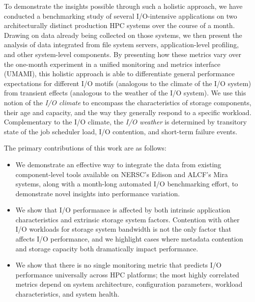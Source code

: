 To demonstrate the insights possible through such a holistic approach, we have conducted a benchmarking study of several I/O-intensive applications on two architecturally distinct production HPC systems over the course of a month.  Drawing on data already being collected on those systems, we then 
present the analysis of data integrated from file system servers, application-level profiling, and other system-level components.
By presenting how these metrics vary over the one-month experiment in a unified monitoring and metrics interface (UMAMI), this holistic approach is able to differentiate general performance expectations for different I/O motifs (analogous to the climate of the I/O system) from transient effects (analogous to the weather of the I/O system).
We use this notion of the \emph{I/O climate} to encompass the characteristics of storage components, their age and capacity, and the way they generally respond to a specific workload.
Complementary to the I/O climate, the \emph{I/O weather} is determined by transitory state of the job scheduler load, I/O contention, and short-term failure events.


The primary contributions of this work are as follows:
\begin{itemize}[leftmargin=*]
\item We demonstrate an effective way to integrate the data from existing component-level tools available on NERSC's Edison and ALCF's Mira systems, along with a month-long automated I/O benchmarking effort, to demonstrate novel insights into performance variation.
\item We show that I/O performance is affected by both intrinsic application characteristics and extrinsic storage system factors.
Contention with other I/O workloads for storage system bandwidth is not the only factor that affects I/O performance, and
we highlight cases where metadata contention and storage capacity both dramatically impact performance.
\item We show that there is no single monitoring metric that predicts I/O performance
universally across HPC platforms; the most highly correlated metrics depend on system architecture, configuration parameters, workload characteristics, and system health.
\end{itemize}
